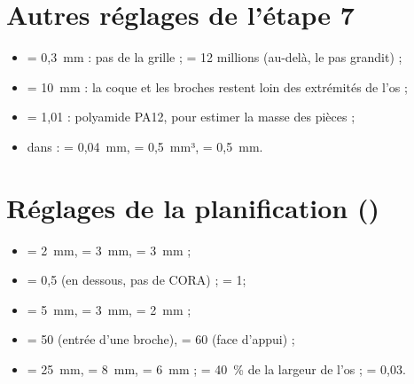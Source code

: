 \section{Autres réglages de l'étape 7}

\begin{itemize}
  \item {} = 0,3~mm : pas de la grille ;  = 12 millions (au-delà, le pas
  grandit) ;
  \item {} = 10~mm : la coque et les broches restent loin des extrémités de l'os ;
  \item {} = 1,01 : polyamide PA12, pour estimer la masse des pièces ;
  \item dans  :  = 0,04~mm,  = 0,5~mm³,
   = 0,5~mm.
\end{itemize}

\enlargethispage{2\baselineskip}      %
\section{Réglages de la planification (\texorpdfstring{}{cora\_simple.js})}

\begin{itemize}[itemsep=0pt]
  \item {} = 2~mm,  = 3~mm,  = 3~mm ;
  \item {} = 0,5\degre{} (en dessous, pas de CORA) ;  = 1\degre ;
  \item {} = 5~mm,  = 3~mm,  = 2~mm ;
  \item {} = 50\degre{} (entrée d'une broche),  = 60\degre{} (face
  d'appui) ;
  \item {} = 25~mm,  = 8~mm,  = 6~mm ;
   = 40~\% de la largeur de l'os ;  = 0,03.
\end{itemize}
